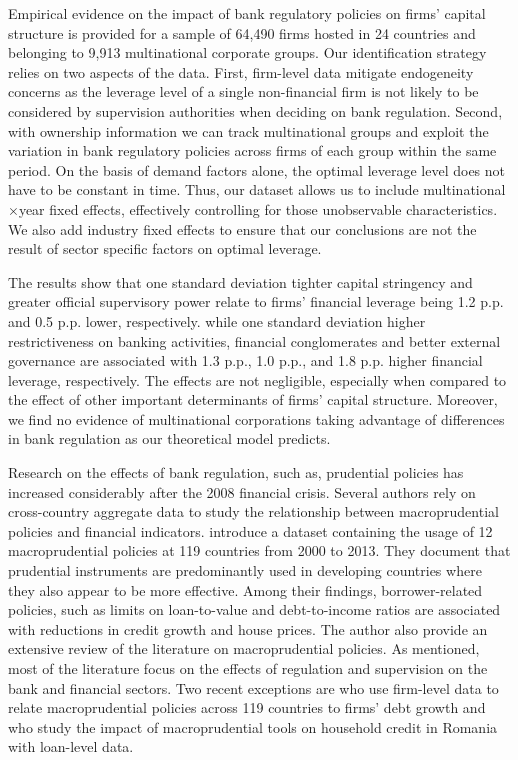 \documentclass[12pt]{article}
\begin{document}
	Empirical evidence on the impact of bank regulatory policies on firms' capital structure is provided for a sample of 64,490 firms hosted in 24 countries and belonging to 9,913 multinational corporate groups. Our identification strategy relies on two aspects of the data. First, firm-level data mitigate endogeneity concerns as the leverage level of a single non-financial firm is not likely to be considered by supervision authorities when deciding on bank regulation. Second, with ownership information we can track multinational groups and exploit the variation in bank regulatory policies across firms of each group within the same period. On the basis of demand factors alone, the optimal leverage level does not have to be constant in time. Thus, our dataset allows us to include multinational$\times$year fixed effects, effectively controlling for those unobservable characteristics. We also add industry fixed effects to ensure that our conclusions are not the result of sector specific factors on optimal leverage. 
	
	The results show that one standard deviation tighter capital stringency and greater official supervisory power relate to firms' financial leverage being 1.2 p.p. and
	0.5 p.p. lower, respectively. while one standard deviation higher restrictiveness on banking activities, financial conglomerates and better external governance are associated with 1.3 p.p., 1.0 p.p., and 1.8 p.p. higher financial leverage, respectively. The effects are not negligible, especially when compared to the effect of other important determinants of firms' capital structure. Moreover, we find no evidence of multinational corporations taking advantage of differences in bank regulation as our theoretical model predicts. 
	
	Research on the effects of bank regulation, such as, prudential policies has increased considerably after the 2008 financial crisis. Several authors rely on cross-country aggregate data to study the relationship between macroprudential policies and financial indicators. \cite*{cerutti2017use} introduce a dataset containing the usage of 12 macroprudential policies at 119 countries from 2000 to 2013. They document that prudential instruments are predominantly used in developing countries where they also appear to be more effective. Among their findings, borrower-related policies, such as limits on loan-to-value and debt-to-income ratios are associated with reductions in credit growth and house prices. The author also provide an extensive review of the literature on macroprudential policies. As mentioned, most of the literature focus on the effects of regulation and supervision on the bank and financial sectors. Two recent exceptions are \cite*{ayyagari2017credit} who use firm-level data to relate macroprudential policies across 119 countries to firms' debt growth and \cite*{epure2017household} who study the impact of macroprudential tools on household credit in Romania with loan-level data.    
	
\end{document}
